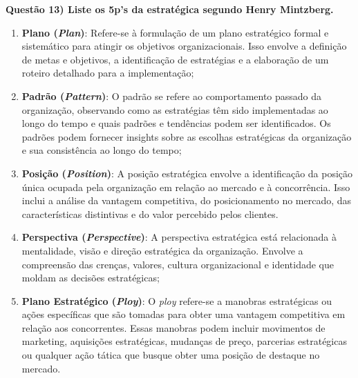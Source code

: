\documentclass[11pt]{article}
\begin{document}
\noindent \textbf{Questão 13) Liste os 5p’s da estratégica segundo Henry Mintzberg.}\par
\begin{enumerate}
    \item \textbf{Plano (\emph{Plan})}: Refere-se à formulação de um plano estratégico formal e sistemático para atingir os objetivos organizacionais. Isso envolve a definição de metas e objetivos, a identificação de estratégias e a elaboração de um roteiro detalhado para a implementação;
    \item \textbf{Padrão (\emph{Pattern})}: O padrão se refere ao comportamento passado da organização, observando como as estratégias têm sido implementadas ao longo do tempo e quais padrões e tendências podem ser identificados. Os padrões podem fornecer insights sobre as escolhas estratégicas da organização e sua consistência ao longo do tempo;
    \item \textbf{Posição (\emph{Position})}: A posição estratégica envolve a identificação da posição única ocupada pela organização em relação ao mercado e à concorrência. Isso inclui a análise da vantagem competitiva, do posicionamento no mercado, das características distintivas e do valor percebido pelos clientes.
    \item \textbf{Perspectiva (\emph{Perspective})}: A perspectiva estratégica está relacionada à mentalidade, visão e direção estratégica da organização. Envolve a compreensão das crenças, valores, cultura organizacional e identidade que moldam as decisões estratégicas;
    \item \textbf{Plano Estratégico (\emph{Ploy})}: O \emph{ploy} refere-se a manobras estratégicas ou ações específicas que são tomadas para obter uma vantagem competitiva em relação aos concorrentes. Essas manobras podem incluir movimentos de marketing, aquisições estratégicas, mudanças de preço, parcerias estratégicas ou qualquer ação tática que busque obter uma posição de destaque no mercado.
\end{enumerate}
\end{document}

